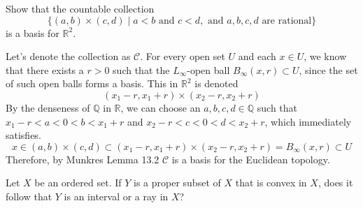   \begin{exercise}[Munkres 16.6]
    Show that the countable collection
    \[\{(a,b) \times (c,d) \mid a < b \text{ and } c < d, \text{ and } a,b,c,d \text{ are rational}\}\]
    is a basis for $\mathbb{R}^2$.
  \end{exercise}
  \begin{solution}[Munkres 16.6]
    Let's denote the collection as $\mathcal{C}$. For every open set $U$ and each $x \in U$, we know that there exists a $r > 0$ such that the $L_\infty$-open ball $B_\infty (x, r) \subset U$, since the set of such open balls forms a basis. This in $\mathbb{R}^2$ is denoted 
    \begin{equation}
      (x_1 - r, x_1 + r) \times (x_2 - r, x_2 + r)
    \end{equation}
    By the denseness of $\mathbb{Q}$ in $\mathbb{R}$, we can choose an $a, b, c, d \in \mathbb{Q}$ such that $x_1 - r < a < 0 < b < x_1 + r$ and $x_2 - r < c < 0 < d < x_2 + r$, which immediately satisfies. 
    \begin{equation}
      x \in (a, b) \times (c, d) \subset (x_1 - r, x_1 + r) \times (x_2 - r, x_2 + r) = B_\infty (x, r) \subset U
    \end{equation}
    Therefore, by Munkres Lemma 13.2 $\mathcal{C}$ is a basis for the Euclidean topology. 
  \end{solution}

  \begin{exercise}[Munkres 16.7]
    Let $X$ be an ordered set. If $Y$ is a proper subset of $X$ that is convex in $X$, does it follow that $Y$ is an interval or a ray in $X$?
  \end{exercise}

